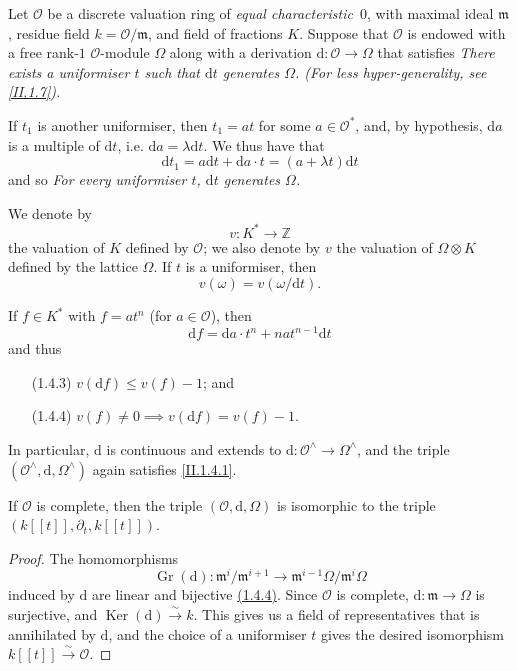 \documentclass{report}
\theoremstyle{plain}
\newenvironment{lemma}[1]
    {\renewcommand\theinnercustomlemma{#1}\innercustomlemma}
    {\endinnercustomlemma}
\theoremstyle{definition}
\newenvironment{env}[1]
    {\renewcommand\theinnercustomenv{#1}\innercustomenv}
    {\endinnercustomenv}
\newcommand{\sh}[1]{{\mathscr{#1}}}
\newcommand{\fk}[1]{{\mathfrak{#1}}}
\newcommand{\ZZ}{\mathbb{Z}}
\newcommand{\dd}{\mathrm{d}}
\renewcommand{\leq}{\leqslant}
\DeclareMathOperator{\Ker}{Ker}
\DeclareMathOperator{\Gr}{Gr}
\newcommand{\oldpage}[1]{\marginpar{\footnotesize$\Big\vert$ \textit{p.~#1}}}
\begin{document}
\begin{env}{1.4}
\label{II.1.4}
  Let $\sh{O}$ be a discrete valuation ring of \emph{equal characteristic~$0$}, with maximal ideal $\fk{m}$, residue field $k=\sh{O}/\fk{m}$, and field of fractions $K$.
  Suppose that $\sh{O}$ is endowed with a free rank-$1$ $\sh{O}$-module $\Omega$ along with a derivation $\dd\colon\sh{O}\to\Omega$ that satisfies
  \begin{env}{1.4.1}
  \label{II.1.4.1}
    \itshape
    There exists a uniformiser $t$ such that $\dd t$ generates $\Omega$.
  \end{env}
  (For less hyper-generality, see \cref{II.1.7}).

  If $t_1$ is another uniformiser, then $t_1=at$ for some $a\in\sh{O}^*$, and, by hypothesis, $\dd a$ is a multiple of $\dd t$, i.e. $\dd a=\lambda\dd t$.
  We thus have that
  \[
    \dd t_1
    = a\dd t + \dd a\cdot t
    = (a+\lambda t)\dd t
  \]
  and so
  \begin{env}{1.4.2}
    \itshape
    For every uniformiser $t$, $\dd t$ generates $\Omega$.
  \end{env}

  We denote by
  \[
    v\colon K^* \to \ZZ
  \]
  the valuation of $K$ defined by $\sh{O}$;
  we also denote by $v$ the valuation of $\Omega\otimes K$ defined by the lattice $\Omega$.
  If $t$ is a uniformiser, then
  \[
    v(\omega) = v(\omega/\dd t).
  \]

  If $f\in K^*$ with $f=at^n$ (for $a\in\sh{O}$), then
  \[
    \dd f = \dd a\cdot t^n + nat^{n-1}\dd t
  \]
  and thus
\oldpage{44}
  \begin{enumerate}
    \item[(1.4.3)] \label{II.1.4.3}
      $v(\dd f) \leq v(f) - 1$; and
    \item[(1.4.4)] \label{II.1.4.4}
      $v(f)\neq0 \implies v(\dd f) = v(f) - 1$.
  \end{enumerate}

  In particular, $\dd$ is continuous and extends to $\dd\colon\sh{O}^\wedge\to\Omega^\wedge$, and the triple $(\sh{O}^\wedge,\dd,\Omega^\wedge)$ again satisfies \cref{II.1.4.1}.
\end{env}

\begin{lemma}{1.5}
\label{II.1.5}
  If $\sh{O}$ is complete, then the triple $(\sh{O},\dd,\Omega)$ is isomorphic to the triple $(k[[t]],\partial_t,k[[t]])$.
\end{lemma}

\begin{proof}
  The homomorphisms
  \[
    \Gr(\dd)\colon \fk{m}^i/\fk{m}^{i+1} \to \fk{m}^{i-1}\Omega/\fk{m}^i\Omega
  \]
  induced by $\dd$ are linear and bijective \hyperref[II.1.4.4]{(1.4.4)}.
  Since $\sh{O}$ is complete, $\dd\colon\fk{m}\to\Omega$ is surjective, and $\Ker(\dd)\xrightarrow{\sim}k$.
  This gives us a field of representatives that is annihilated by $\dd$, and the choice of a uniformiser $t$ gives the desired isomorphism $k[[t]]\xrightarrow{\sim}\sh{O}$.
\end{proof}
\end{document}
